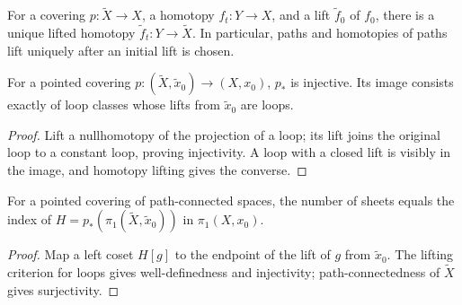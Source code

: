 \begin{proposition}
\label{prop:covering-homotopy-property}



For a covering $p:\widetilde X\to X$, a homotopy $f_t:Y\to X$, and a lift
$\widetilde f_0$ of $f_0$, there is a unique lifted homotopy
$\widetilde f_t:Y\to\widetilde X$. In particular, paths and homotopies of
paths lift uniquely after an initial lift is chosen.
\end{proposition}

\begin{proposition}
\label{prop:covering-map-pi1-injective}



For a pointed covering $p:(\widetilde X,\widetilde x_0)\to(X,x_0)$, $p_*$
is injective. Its image consists exactly of loop classes whose lifts from
$\widetilde x_0$ are loops.
\end{proposition}

\begin{proof}
\sketch Lift a nullhomotopy of the projection of a loop; its lift joins the
original loop to a constant loop, proving injectivity. A loop with a closed
lift is visibly in the image, and homotopy lifting gives the converse.
\end{proof}

\begin{proposition}
\label{prop:covering-sheets-equals-index}



For a pointed covering of path-connected spaces, the number of sheets equals
the index of $H=p_*(\pi_1(\widetilde X,\widetilde x_0))$ in $\pi_1(X,x_0)$.
\end{proposition}

\begin{proof}
\sketch Map a left coset $H[g]$ to the endpoint of the lift of $g$ from
$\widetilde x_0$. The lifting criterion for loops gives well-definedness and
injectivity; path-connectedness of $\widetilde X$ gives surjectivity.
\end{proof}

